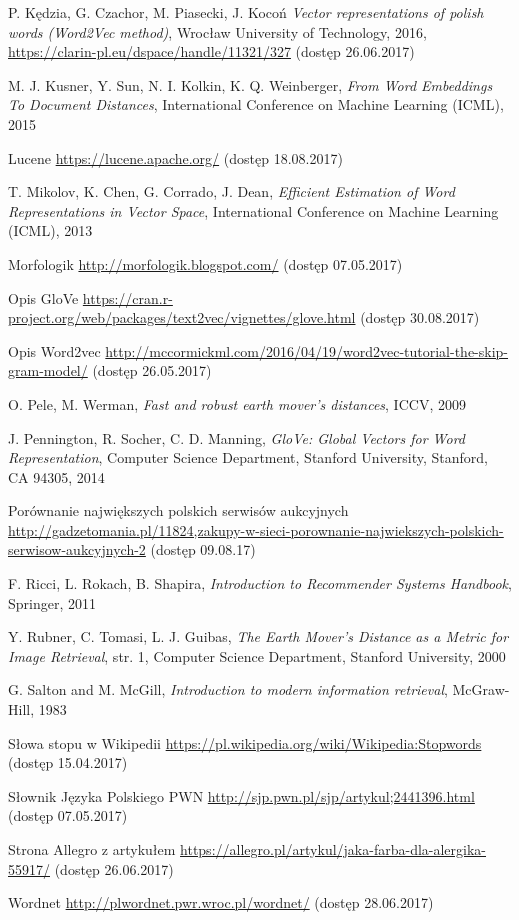 \documentclass[pl]{minipw} %
\begin{document}
\begin{thebibliography}{30}
		P. Kędzia, G. Czachor, M. Piasecki, J. Kocoń
		\emph{Vector representations of polish words (Word2Vec method)},
		Wrocław University of Technology,
		2016,
		\url{https://clarin-pl.eu/dspace/handle/11321/327}
		(dostęp 26.06.2017)
	
		M. J. Kusner, Y. Sun, N. I. Kolkin, K. Q. Weinberger,
		\emph{From Word Embeddings To Document Distances},
		International Conference on Machine Learning (ICML),
		2015
	
		Lucene
		\url{https://lucene.apache.org/}
		(dostęp 18.08.2017)
	
		T. Mikolov, K. Chen, G. Corrado, J. Dean,
		\emph{Efficient Estimation of Word Representations in Vector Space},
		International Conference on Machine Learning (ICML),
		2013
	
		Morfologik
		\url{http://morfologik.blogspot.com/}
		(dostęp 07.05.2017)
	
		Opis GloVe
		\url{https://cran.r-project.org/web/packages/text2vec/vignettes/glove.html}
		(dostęp 30.08.2017)
	
		Opis Word2vec
		\url{http://mccormickml.com/2016/04/19/word2vec-tutorial-the-skip-gram-model/}
		(dostęp 26.05.2017)
	
		O. Pele, M. Werman,
		\emph{Fast and robust earth mover's distances},
		ICCV,
		2009
	
		J. Pennington, R. Socher, C. D. Manning,
		\emph{GloVe: Global Vectors for Word Representation},
		Computer Science Department, Stanford University, Stanford, CA 94305,
		2014
	
		Porównanie największych polskich serwisów aukcyjnych
		\url{http://gadzetomania.pl/11824,zakupy-w-sieci-porownanie-najwiekszych-polskich-serwisow-aukcyjnych-2}
		(dostęp 09.08.17)
	
		F. Ricci, L. Rokach, B. Shapira,
		\emph{Introduction to Recommender Systems Handbook},
		Springer,
		2011
	
		Y. Rubner, C. Tomasi, L. J. Guibas,
		\emph{The Earth Mover's Distance as a Metric for Image Retrieval},
		str. 1,
		Computer Science Department, Stanford University,
		2000	

		G. Salton and M. McGill,
		\emph{Introduction to modern information retrieval},
		McGraw-Hill,
		1983
	
		Słowa stopu w Wikipedii
		\url{https://pl.wikipedia.org/wiki/Wikipedia:Stopwords}
		(dostęp 15.04.2017)
	
		Słownik Języka Polskiego PWN
		\url{http://sjp.pwn.pl/sjp/artykul;2441396.html}
		(dostęp 07.05.2017)
	
		Strona Allegro z artykułem
		\url{https://allegro.pl/artykul/jaka-farba-dla-alergika-55917/}
		(dostęp 26.06.2017)
		
		Wordnet
		\url{http://plwordnet.pwr.wroc.pl/wordnet/}
		(dostęp 28.06.2017)
\end{thebibliography}
\end{document}
